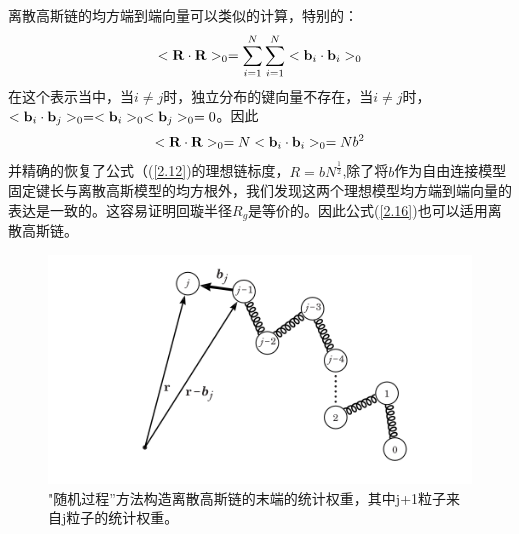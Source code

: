 离散高斯链的均方端到端向量可以类似的计算，特别的：
\begin{equation}\label{2.31}
<\mathbf{R}\cdot\mathbf{R}>_{0}=\sum_{i=1}^{N}\sum_{i=1}^{N}<\mathbf{b}_{i}\cdot\mathbf{b}_{i}>_{0}
\end{equation}
在这个表示当中，当$i\neq j$时，独立分布的键向量不存在，当$i\neq j$时，$<\mathbf{b}_{i}\cdot\mathbf{b}_{j}>_{0}=<\mathbf{b}_{i}>_{0}<\mathbf{b}_{j}>_{0}=0$。因此
\begin{equation}\label{2.32}
<\mathbf{R}\cdot\mathbf{R}>_{0}=N<\mathbf{b}_{i}\cdot\mathbf{b}_{i}>_{0}=Nb^2
\end{equation}
并精确的恢复了公式（(\ref{2.12})的理想链标度，$R=bN^\frac{1}{2}$,除了将$b$作为自由连接模型固定键长与离散高斯模型的均方根外，我们发现这两个理想模型均方端到端向量的表达是一致的。这容易证明回璇半径$R_{g}$是等价的。因此公式(\ref{2.16})也可以适用离散高斯链。
\begin{figure}[H]
\centering
\includegraphics[width=15cm]{./figures/23.png}
\caption{"随机过程”方法构造离散高斯链的末端的统计权重，其中j+1粒子来自j粒子的统计权重。}
\label{figures23}
\end{figure}


